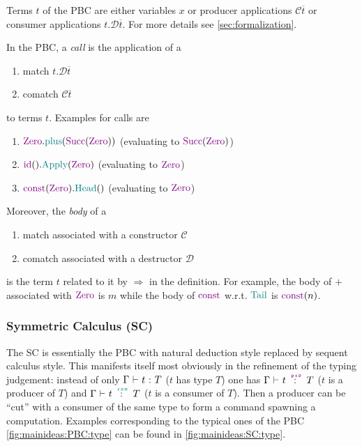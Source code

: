 Terms $t$ of the PBC are either variables $x$ or producer applications $\mathcal{C}\overline{t}$ or consumer applications $t.\mathcal{D}\overline{t}$.
For more details see \cref{sec:formalization}.

In the PBC, a \textit{call} is the application of a
\begin{enumerate}
  \item
    match $t.\mathcal{D}\overline{t}$
  \item
    comatch $\mathcal{C}\overline{t}$
\end{enumerate}
to terms $t$.
Examples for calls are
\begin{enumerate}
  \item
    $\Zero.\plus(\Succ(\Zero))$ (evaluating to $\Succ(\Zero)$)
  \item
    $\id().\Apply(\Zero)$ (evaluating to $\Zero$)
  \item
    $\const(\Zero).\Head()$ (evaluating to $\Zero$)
\end{enumerate}
Moreover, the \textit{body} of a
\begin{enumerate}
  \item
    match associated with a constructor $\mathcal{C}$
  \item
    comatch associated with a destructor $\mathcal{D}$
\end{enumerate}
is the term $t$ related to it by $\Rightarrow$ in the definition.
For example, the body of $\plus$ associated with $\Zero$ is $m$ while the body of $\const$ w.r.t. $\Tail$ is $\const(n)$.

\subsubsection{Symmetric Calculus (SC)}

The SC is essentially the PBC with natural deduction style replaced by sequent calculus style.
This manifests itself most obviously in the refinement of the typing judgement: instead of only $\typetmpbc{\Gamma}{t}{T}$ ($t$ has type $T$) one has $\typetmprd{\Gamma}{t}{T}$ ($t$ is a producer of $T$) and $\typetmcon{\Gamma}{t}{T}$ ($t$ is a consumer of $T$).
Then a producer can be \enquote{cut} with a consumer of the same type to form a command spawning a computation.
Examples corresponding to the typical ones of the PBC \cref{fig:mainideas:PBC:type} can be found in \cref{fig:mainideas:SC:type}.

